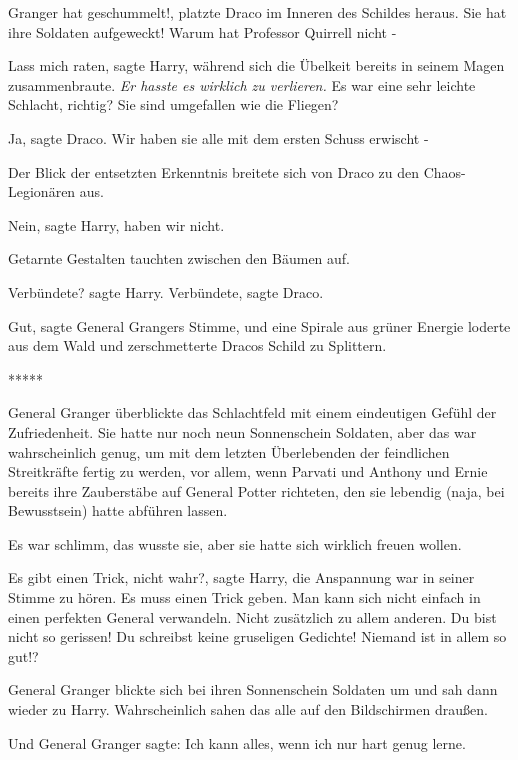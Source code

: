 \glqq{}Granger hat geschummelt!\grqq{}, platzte Draco im Inneren des Schildes
heraus. \glqq{}Sie hat ihre Soldaten aufgeweckt! Warum hat Professor Quirrell
nicht -\grqq{}

\glqq{}Lass mich raten\grqq{}, sagte Harry, während sich die Übelkeit bereits in
seinem Magen zusammenbraute. \emph{Er hasste es wirklich zu verlieren.}
\glqq{}Es war eine sehr leichte Schlacht, richtig? Sie sind umgefallen wie die
Fliegen?\grqq{}

\glqq{}Ja\grqq{}, sagte Draco. \glqq{}Wir haben sie alle mit dem ersten Schuss
erwischt -

\grqq{} Der Blick der entsetzten Erkenntnis breitete sich von Draco zu den
Chaos-Legionären aus.

\glqq{}Nein\grqq{}, sagte Harry, \glqq{}haben wir nicht.\grqq{}

Getarnte Gestalten tauchten zwischen den Bäumen auf.

\glqq{}Verbündete?\grqq{} sagte Harry. \glqq{}Verbündete\grqq{}, sagte Draco.

\glqq{}Gut\grqq{}, sagte General Grangers Stimme, und eine Spirale aus grüner
Energie loderte aus dem Wald und zerschmetterte Dracos Schild zu Splittern.

\begin{center}*****\end{center}

General Granger überblickte das Schlachtfeld mit einem eindeutigen Gefühl der
Zufriedenheit. Sie hatte nur noch neun Sonnenschein Soldaten, aber das war
wahrscheinlich genug, um mit dem letzten Überlebenden der feindlichen
Streitkräfte fertig zu werden, vor allem, wenn Parvati und Anthony und Ernie
bereits ihre Zauberstäbe auf General Potter richteten, den sie lebendig (naja,
bei Bewusstsein) hatte abführen lassen.

Es war schlimm, das wusste sie, aber sie hatte sich wirklich freuen wollen.

\glqq{}Es gibt einen Trick, nicht wahr?\grqq{}, sagte Harry, die Anspannung war
in seiner Stimme zu hören. \glqq{}Es muss einen Trick geben. Man kann sich nicht
einfach in einen perfekten General verwandeln. Nicht zusätzlich zu allem
anderen. Du bist nicht so gerissen! Du schreibst keine gruseligen Gedichte!
Niemand ist in allem so gut!?\grqq{}

General Granger blickte sich bei ihren Sonnenschein Soldaten um und sah dann
wieder zu Harry. Wahrscheinlich sahen das alle auf den Bildschirmen draußen.

Und General Granger sagte: \glqq{}Ich kann alles, wenn ich nur hart genug
lerne.\grqq{}

